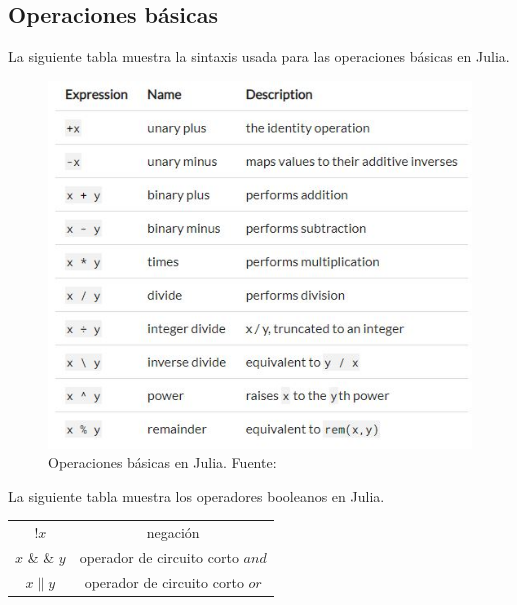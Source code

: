 \subsection{Operaciones básicas}
La siguiente tabla muestra la sintaxis usada para las operaciones básicas en Julia. 

\begin{figure}[h]
\begin{center}
\includegraphics[scale=0.6]{Imagenes/operaciones_basicas_julia.JPG}
 \caption{Operaciones básicas en Julia. Fuente: \cite{Julia_manual}}
  \label{basic_operations_Julia}
\end{center}
\end{figure}

La siguiente tabla muestra los operadores booleanos en Julia. 

\begin{center}
\begin{tabular}{ |c|c| } 
 \hline
 $!x$ & negación \\ 
 $x$ \& \& $y$ & operador de circuito corto $and$ \\ 
 $x \| y$ & operador de circuito corto $or$ \\ 
 \hline
\end{tabular}
\end{center}

